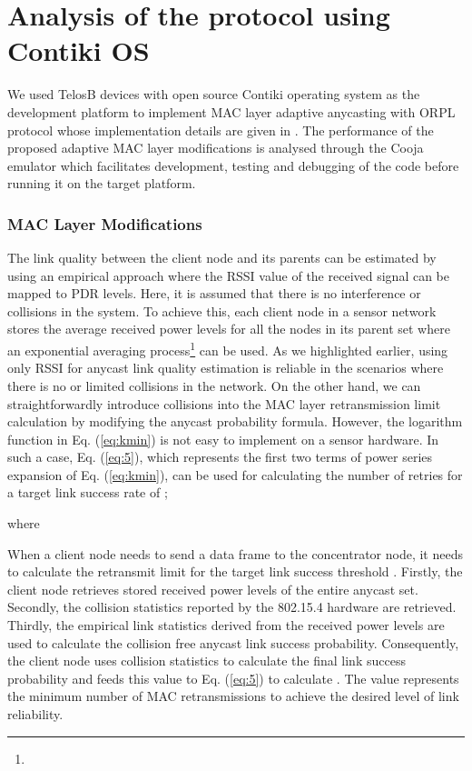 \documentclass[conference]{IEEEtran}
\begin{document}
\section{Analysis of the protocol using Contiki OS}\label{protocolImplementation}
We used TelosB \cite{telosb} devices with open source Contiki operating system as the development platform to implement MAC layer adaptive anycasting with ORPL protocol whose implementation details are given in \cite{orpl}. The performance of the proposed adaptive MAC layer modifications is analysed through the Cooja emulator \cite{contiki}  which facilitates development, testing and debugging of the code before running it on the target platform.

\subsubsection{MAC Layer Modifications}
The link quality between the client node and its parents can be estimated by using an empirical approach where the RSSI value of the received signal can be mapped to PDR levels. Here, it is assumed that there is no interference or collisions in the system. To achieve this, each client node in a sensor network stores the average received power levels for all the nodes in its parent set where an exponential averaging process\footnote{} can be used. As we highlighted earlier, using only RSSI for anycast link quality estimation is reliable in the scenarios where there is no or limited collisions in the network. On the other hand, we can straightforwardly introduce collisions into the MAC layer retransmission limit calculation by modifying the anycast probability formula. However, the logarithm function in Eq. (\ref{eq:kmin}) is not easy to implement on a sensor hardware. In such a case, Eq. (\ref{eq:5}),  which represents the first two terms of power series expansion of Eq. (\ref{eq:kmin}), can be used for calculating the number of retries for a target link success rate of ;

where


When a client node needs to send a data frame to the concentrator
node, it needs to calculate the retransmit limit for the target link
success threshold . Firstly, the client node retrieves stored
received power levels of the entire anycast set. Secondly, the collision statistics reported by the 802.15.4 hardware are retrieved. Thirdly, the empirical link statistics derived from the received power levels are used to calculate the collision free anycast link success probability. Consequently, the client node uses collision statistics to calculate the final link success probability and feeds this value to Eq. (\ref{eq:5}) to calculate . The  value represents the minimum number of MAC retransmissions to achieve the desired level of link reliability.
\end{document}

